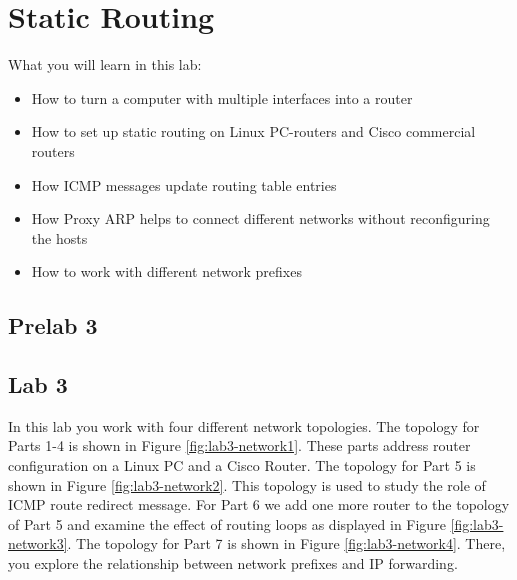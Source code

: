 
\chapter{Static Routing}

What you will learn in this lab:

\begin{itemize}
	\item How to turn a computer with multiple interfaces into a router
	\item How to set up static routing on Linux PC-routers and Cisco commercial routers
	\item How ICMP messages update routing table entries
	\item How Proxy ARP helps to connect different networks without reconfiguring the hosts
	\item How to work with different network prefixes
\end{itemize}

\newpage
{}
\section{Prelab 3}\label{sec:prelab3}


\newpage
{}
\section{Lab 3}\label{sec:lab3}

In this lab you work with four different network topologies. The topology for Parts 1-4 is shown in Figure \ref{fig:lab3-network1}. These parts address router configuration on a Linux PC and a Cisco Router. The topology for Part 5 is shown in Figure \ref{fig:lab3-network2}. This topology is used to study the role of ICMP route redirect message. For Part 6 we add one more router to the topology of Part 5 and examine the effect of routing loops as displayed in Figure \ref{fig:lab3-network3}. The topology for Part 7 is shown in Figure \ref{fig:lab3-network4}. There, you explore the relationship between network prefixes and IP forwarding.



